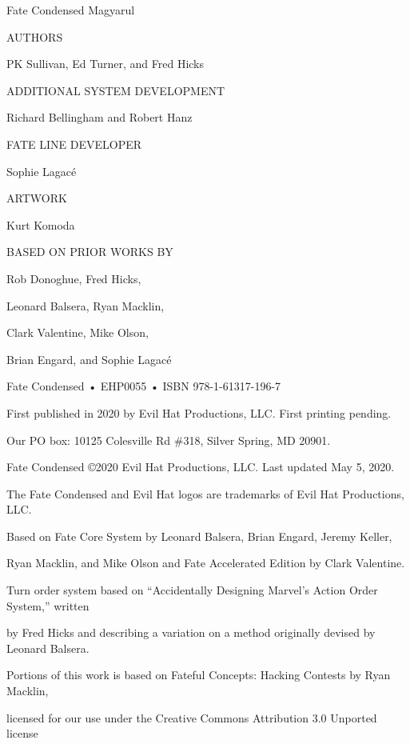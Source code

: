 \begin{center}
Fate Condensed Magyarul

AUTHORS

PK Sullivan, Ed Turner, and Fred Hicks

ADDITIONAL SYSTEM DEVELOPMENT

Richard Bellingham and Robert Hanz

FATE LINE DEVELOPER

Sophie Lagacé

ARTWORK

Kurt Komoda

BASED ON PRIOR WORKS BY

Rob Donoghue, Fred Hicks,

Leonard Balsera, Ryan Macklin,

Clark Valentine, Mike Olson,

Brian Engard, and Sophie Lagacé

Fate Condensed • EHP0055 • ISBN 978-1-61317-196-7

First published in 2020 by Evil Hat Productions, LLC. First printing pending.

Our PO box: 10125 Colesville Rd \#318, Silver Spring, MD 20901.

Fate Condensed ©2020 Evil Hat Productions, LLC. Last updated May 5, 2020.

The Fate Condensed and Evil Hat logos are trademarks of Evil Hat Productions, LLC.

Based on Fate Core System by Leonard Balsera, Brian Engard, Jeremy Keller,

Ryan Macklin, and Mike Olson and Fate Accelerated Edition by Clark Valentine.

Turn order system based on “Accidentally Designing Marvel’s Action Order System,” written

by Fred Hicks and describing a variation on a method originally devised by Leonard Balsera.

Portions of this work is based on Fateful Concepts: Hacking Contests by Ryan Macklin,

licensed for our use under the Creative Commons Attribution 3.0 Unported license
\end{center}
